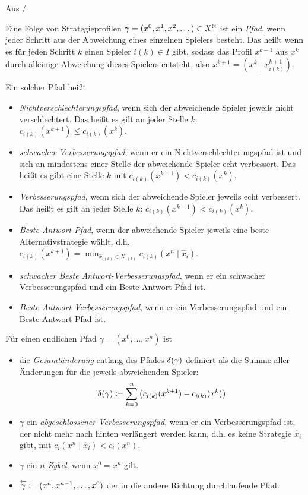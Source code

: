 Aus \cite{MonShap}/\cite{BestRespPot}

\begin{defn}
	Eine Folge von Strategieprofilen $\gamma = (x^0, x^1, x^2, \dots) \in X^{\mathbb{N}}$ ist ein \emph{Pfad}, wenn jeder Schritt aus der Abweichung eines einzelnen Spielers besteht. Das heißt wenn es für jeden Schritt $k$ einen Spieler $i(k) \in I$ gibt, sodass das Profil $x^{k+1}$ aus $x^k$ durch alleinige Abweichung dieses Spielers entsteht, also $x^{k+1} = \left(x^k \middle| x^{k+1}_{i(k)}\right)$.
	
	Ein solcher Pfad heißt
	\begin{itemize}
		\item \emph{Nichtverschlechterungspfad}, wenn sich der abweichende Spieler jeweils nicht verschlechtert. Das heißt es gilt an jeder Stelle $k$: $c_{i(k)}(x^{k+1}) \leq c_{i(k)}(x^k)$.
		\item \emph{schwacher Verbesserungspfad}, wenn er ein Nichtverschlechterungspfad ist und sich an mindestens einer Stelle der abweichende Spieler echt verbessert. Das heißt es gibt eine Stelle $k$ mit $c_{i(k)}(x^{k+1}) < c_{i(k)}(x^k)$.
		\item \emph{Verbesserungspfad}, wenn sich der abweichende Spieler jeweils echt verbessert. Das heißt es gilt an jeder Stelle $k$: $c_{i(k)}(x^{k+1}) < c_{i(k)}(x^k)$.
		\item \emph{Beste Antwort-Pfad}, wenn der abweichende Spieler jeweils eine beste Alternativstrategie wählt, d.h. $c_{i(k)}(x^{k+1}) = \min_{\hat{x}_{i(k)} \in X_{i(k)}} c_{i(k)}(x^n \mid \hat{x}_i)$.
		\item \emph{schwacher Beste Antwort-Verbesserungspfad}, wenn er ein schwacher Verbesserungspfad und ein Beste Antwort-Pfad ist.
		\item \emph{Beste Antwort-Verbesserungspfad}, wenn er ein Verbesserungspfad und ein Beste Antwort-Pfad ist.
	\end{itemize}
	
	Für einen endlichen Pfad $\gamma = (x^0, \dots, x^n)$ ist
	\begin{itemize}
		\item die \emph{Gesamtänderung} entlang des Pfades $\delta(\gamma)$ definiert als die Summe aller Änderungen für die jeweils abweichenden Spieler:
		\[\delta(\gamma) \coloneqq \sum_{k=0}^{n} \left(c_{i(k)}(x^{k+1}) - c_{i(k)}(x^k)\right) \]
		\item $\gamma$ ein \emph{abgeschlossener Verbesserungspfad}, wenn er ein Verbesserungspfad ist, der nicht mehr nach hinten verlängert werden kann, d.h. es keine Strategie $\hat{x}_i$ gibt, mit $c_{i}(x^n \mid \hat{x}_i) < c_{i}(x^n)$.
		\item $\gamma$ ein \emph{$n$-Zykel}, wenn $x^0 = x^n$ gilt.
		\item $\overset{\leftarrow}{\gamma} \coloneqq (x^n, x^{n-1}, \dots, x^0)$ der in die andere Richtung durchlaufende Pfad.
	\end{itemize}


\end{defn}
